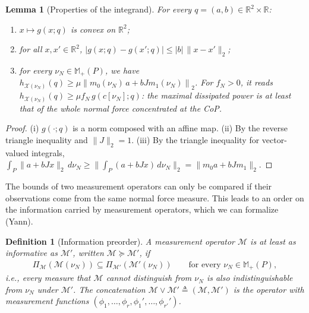 \documentclass[11pt,a4paper]{article}
\theoremstyle{plain}
\newtheorem{lemma}[theorem]{Lemma}
\newtheorem{definition}[theorem]{Definition}
\newcommand{\R}{\mathbb{R}}
\newcommand{\X}{\mathcal X}
\begin{document}
\begin{lemma}[Properties of the integrand]
\label{lem:integrand}
    For every $q=(a,b)\in\R^2\times\R$:
    \begin{enumerate}[label=(\roman*)]
        \item $x\mapsto g(x;q)$ is convex on $\R^2$;
        \item for all $x,x'\in\R^2$, $\left|g(x;q)-g(x';q)\right|\le|b|\,\|x-x'\|_2$;
        \item for every $\nu_N\in\mathbb M_+(P)$, we have $h_{\X(\nu_N)}(q)\ge\mu\left\|m_0(\nu_N)\,a+bJm_1(\nu_N)\right\|_2$. For $f_N>0$, it reads $h_{\X(\nu_N)}(q)\ge\mu f_N\,g(c[\nu_N];q)$: the maximal dissipated power is at least that of the whole normal force concentrated at the CoP.
    \end{enumerate}
\end{lemma}
\begin{proof}
    (i) $g(\cdot;q)$ is a norm composed with an affine map.
    (ii) By the reverse triangle inequality and $\|J\|_2=1$.
    (iii) By the triangle inequality for vector-valued integrals, $\int_P\|a+bJx\|_2\,d\nu_N\ge\|\int_P(a+bJx)\,d\nu_N\|_2=\|m_0a+bJm_1\|_2$.
\end{proof}

The bounds of two measurement operators can only be compared if their observations come from the same normal force measure. 
This leads to an order on the information carried by measurement operators, which we can formalize (Yann).

\begin{definition}[Information preorder]
\label{def:preorder}
    A measurement operator $\mathcal M$ is \textit{at least as informative} as $\mathcal M'$, written $\mathcal M\succeq\mathcal M'$, if
    \begin{align}
        \Pi_{\mathcal M}(\mathcal M(\nu_N))\subseteq\Pi_{\mathcal M'}(\mathcal M'(\nu_N))\qquad\text{for every }\nu_N\in\mathbb M_+(P),
    \end{align}
    i.e., every measure that $\mathcal M$ cannot distinguish from $\nu_N$ is also indistinguishable from $\nu_N$ under $\mathcal M'$. The \textit{concatenation}
    $\mathcal M\vee\mathcal M'\triangleq(\mathcal M,\mathcal M')$ is the operator with measurement functions $(\phi_1,\ldots,\phi_r,\phi_1',\ldots,\phi_{r'}')$.
\end{definition}
\end{document}
